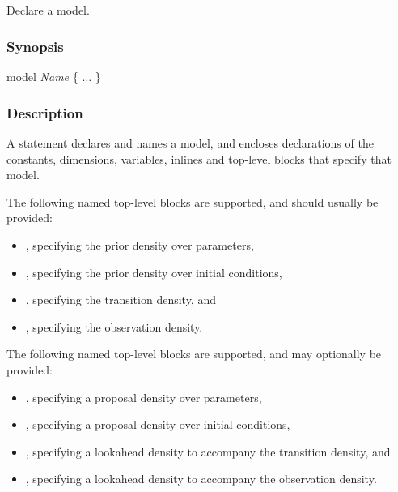 \subsection{\label{model}}

Declare a model.

\subsubsection*{Synopsis\label{model_Synopsis}}
\begin{bicode}
model \textsl{Name} \{
  \(\ldots\)
\}
\end{bicode}

\subsubsection*{Description\label{model_Description}}

A  statement declares and names a model, and encloses
declarations of the constants, dimensions, variables, inlines and top-level
blocks that specify that model.

The following named top-level blocks are supported, and should usually be
provided:
\begin{itemize}
\item {}, specifying the prior density over parameters,
\item {}, specifying the prior density over initial conditions,
\item {}, specifying the transition density, and
\item {}, specifying the observation density.
\end{itemize}

The following named top-level blocks are supported, and may optionally be
provided:
\begin{itemize}
\item {}, specifying a proposal density over parameters,
\item {}, specifying a proposal density over initial conditions,
\item {}, specifying a lookahead density to accompany the transition density, and
\item {}, specifying a lookahead density to accompany the observation density.
\end{itemize}

